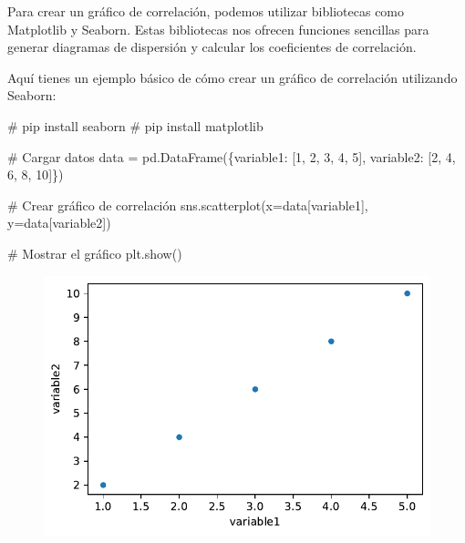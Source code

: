 \documentclass[
  a4paper,
]{article}
\newenvironment{Shaded}{}{}
\newcommand{\CommentTok}[1]{\textcolor[rgb]{0.42,0.45,0.49}{#1}}
\newcommand{\DecValTok}[1]{\textcolor[rgb]{0.00,0.36,0.77}{#1}}
\newcommand{\NormalTok}[1]{\textcolor[rgb]{0.14,0.16,0.18}{#1}}
\newcommand{\OperatorTok}[1]{\textcolor[rgb]{0.14,0.16,0.18}{#1}}
\newcommand{\StringTok}[1]{\textcolor[rgb]{0.01,0.18,0.38}{#1}}
\begin{document}
Para crear un gráfico de correlación, podemos utilizar bibliotecas como
Matplotlib y Seaborn. Estas bibliotecas nos ofrecen funciones sencillas
para generar diagramas de dispersión y calcular los coeficientes de
correlación.

Aquí tienes un ejemplo básico de cómo crear un gráfico de correlación
utilizando Seaborn:

\begin{Shaded}
\begin{Highlighting}[]
\CommentTok{\# pip install seaborn}
\CommentTok{\# pip install matplotlib}


\CommentTok{\# Cargar datos}
\NormalTok{data }\OperatorTok{=}\NormalTok{ pd.DataFrame(\{}\StringTok{\textquotesingle{}variable1\textquotesingle{}}\NormalTok{: [}\DecValTok{1}\NormalTok{, }\DecValTok{2}\NormalTok{, }\DecValTok{3}\NormalTok{, }\DecValTok{4}\NormalTok{, }\DecValTok{5}\NormalTok{],}
                     \StringTok{\textquotesingle{}variable2\textquotesingle{}}\NormalTok{: [}\DecValTok{2}\NormalTok{, }\DecValTok{4}\NormalTok{, }\DecValTok{6}\NormalTok{, }\DecValTok{8}\NormalTok{, }\DecValTok{10}\NormalTok{]\})}

\CommentTok{\# Crear gráfico de correlación}
\NormalTok{sns.scatterplot(x}\OperatorTok{=}\NormalTok{data[}\StringTok{\textquotesingle{}variable1\textquotesingle{}}\NormalTok{], y}\OperatorTok{=}\NormalTok{data[}\StringTok{\textquotesingle{}variable2\textquotesingle{}}\NormalTok{])}

\CommentTok{\# Mostrar el gráfico}
\NormalTok{plt.show()}
\end{Highlighting}
\end{Shaded}

\begin{figure}[H]

{\centering \includegraphics{index_files/figure-pdf/cell-4-output-1.pdf}

}

\end{figure}
\end{document}
